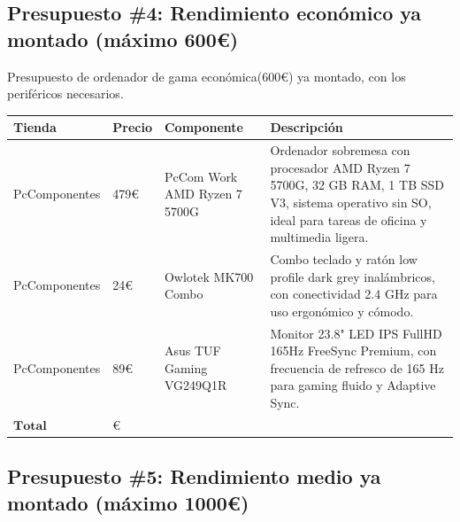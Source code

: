 \documentclass[spanish,openany]{report}
\begin{document}
\clearpage
{}
\subsection*{Presupuesto \#4: Rendimiento económico ya montado (máximo 600\euro)}
Presupuesto de ordenador de gama económica(600\euro) ya montado, con los periféricos necesarios.

\begin{tabularx}{\linewidth}{|C{2.5cm}|Y|Y|Y|}
\hline
Tienda & Precio & Componente & Descripción \\
\hline
PcComponentes & 479\euro & PcCom Work AMD Ryzen 7 5700G & Ordenador sobremesa con procesador AMD Ryzen 7 5700G, 32 GB RAM, 1 TB SSD V3, sistema operativo sin SO, ideal para tareas de oficina y multimedia ligera. \\
\hline
PcComponentes & 24\euro & Owlotek MK700 Combo & Combo teclado y ratón low profile dark grey inalámbricos, con conectividad 2.4 GHz para uso ergonómico y cómodo. \\
\hline
PcComponentes & 89\euro & Asus TUF Gaming VG249Q1R & Monitor 23.8" LED IPS FullHD 165Hz FreeSync Premium, con frecuencia de refresco de 165 Hz para gaming fluido y Adaptive Sync. \\ \hline
\large{$\mathbf{Total}$} &    \\
\hline
\end{tabularx}
\vspace{3em}
\subsection*{Presupuesto \#5: Rendimiento medio ya montado (máximo 1000\euro)}
\end{document}
